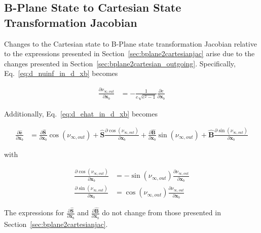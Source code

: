 \documentclass[]{article}
\newcommand{\vb}[1]{\bm{#1}} %
\newcommand{\vbh}[1]{\hat{\bm{#1}}} %
\newcommand{\pd}[2]{\frac{\partial #1}{\partial #2}} %
\newcommand{\xb}[0]{\vb{x}_b}
\begin{document}
\subsection{B-Plane State to Cartesian State Transformation Jacobian}
\label{sec:bplane2cartesianjac_outgoing}

Changes to the Cartesian state to B-Plane state transformation Jacobian relative to the expressions presented in Section~\ref{sec:bplane2cartesianjac} arise due to the changes presented in Section~\ref{sec:bplane2cartesian_outgoing}. Specifically, Eq.~\eqref{eq:d_nuinf_in_d_xb} becomes

\begin{align}
	\pd{\nu_{\infty, out}}{\xb} &= - \frac{1}{e \sqrt{e^2 - 1}} \pd{e}{\xb} 
\end{align}

Additionally, Eq.~\eqref{eq:d_ehat_in_d_xb} becomes

\begin{align}
	\pd{\vbh{e}}{\xb} &= \pd{\vbh{S}}{\xb} \cos \left( \nu_{\infty, out} \right) + \vbh{S} \pd{\cos \left( \nu_{\infty, out} \right)}{\xb}  + \pd{\vbh{B}}{\xb} \sin \left( \nu_{\infty, out} \right) + \vbh{B} \pd{\sin \left( \nu_{\infty, out} \right)}{\xb}
\end{align}

\noindent with

\begin{align}
	\pd{\cos \left( \nu_{\infty, out} \right)}{\xb} &= - \sin \left( \nu_{\infty, out} \right) \pd{\nu_{\infty, out}}{\xb} \\
	\pd{\sin \left( \nu_{\infty, out} \right)}{\xb} &= \cos \left( \nu_{\infty, out} \right) \pd{\nu_{\infty, out}}{\xb}
\end{align}

\noindent The expressions for $\pd{\vbh{S}}{\xb}$ and $\pd{\vbh{B}}{\xb}$ do not change from those presented in Section~\ref{sec:bplane2cartesianjac}.

%
%
\end{document}

